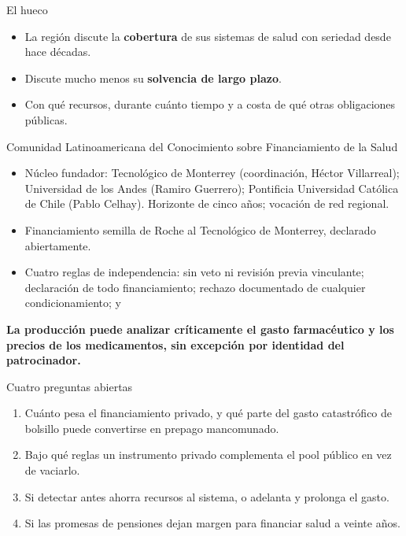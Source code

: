 \documentclass[aspectratio=169,11pt]{beamer}
\newcommand{\clave}[1]{\textcolor{acento}{\textbf{#1}}}
\newcommand{\destacar}[1]{\vspace{0.6em}\begin{center}\textbf{#1}\end{center}}
\begin{document}

\begin{frame}{El hueco}
  \begin{itemize}
    \item La región discute la \clave{cobertura} de sus sistemas de salud con seriedad desde hace décadas.
    \item Discute mucho menos su \clave{solvencia de largo plazo}.
    \item Con qué recursos, durante cuánto tiempo y a costa de qué otras obligaciones públicas.
  \end{itemize}
\end{frame}

\begin{frame}{Comunidad Latinoamericana del Conocimiento sobre Financiamiento de la Salud}
  \small
  \begin{itemize}
    \item Núcleo fundador: Tecnológico de Monterrey (coordinación, Héctor Villarreal); Universidad de los Andes (Ramiro Guerrero); Pontificia Universidad Católica de Chile (Pablo Celhay). Horizonte de cinco años; vocación de red regional.
    \item Financiamiento semilla de Roche al Tecnológico de Monterrey, declarado abiertamente.
    \item Cuatro reglas de independencia: sin veto ni revisión previa vinculante; declaración de todo financiamiento; rechazo documentado de cualquier condicionamiento; y
  \end{itemize}
  \destacar{La producción puede analizar críticamente el gasto farmacéutico y los precios de los medicamentos, sin excepción por identidad del patrocinador.}
\end{frame}

\begin{frame}{Cuatro preguntas abiertas}
  \begin{enumerate}
    \item Cuánto pesa el financiamiento privado, y qué parte del gasto catastrófico de bolsillo puede convertirse en prepago mancomunado.
    \item Bajo qué reglas un instrumento privado complementa el pool público en vez de vaciarlo.
    \item Si detectar antes ahorra recursos al sistema, o adelanta y prolonga el gasto.
    \item Si las promesas de pensiones dejan margen para financiar salud a veinte años.
  \end{enumerate}
\end{frame}
\end{document}
